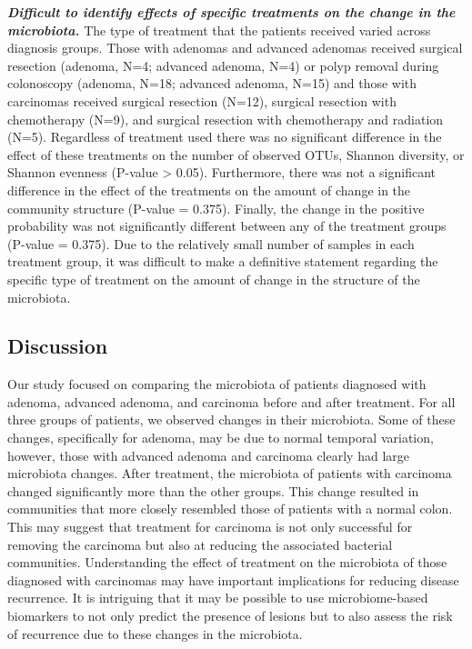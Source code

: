 \documentclass[12pt,]{article}
\begin{document}
\textbf{\emph{Difficult to identify effects of specific treatments on
the change in the microbiota.}} The type of treatment that the patients
received varied across diagnosis groups. Those with adenomas and
advanced adenomas received surgical resection (adenoma, N=4; advanced
adenoma, N=4) or polyp removal during colonoscopy (adenoma, N=18;
advanced adenoma, N=15) and those with carcinomas received surgical
resection (N=12), surgical resection with chemotherapy (N=9), and
surgical resection with chemotherapy and radiation (N=5). Regardless of
treatment used there was no significant difference in the effect of
these treatments on the number of observed OTUs, Shannon diversity, or
Shannon evenness (P-value \textgreater{} 0.05). Furthermore, there was
not a significant difference in the effect of the treatments on the
amount of change in the community structure (P-value = 0.375). Finally,
the change in the positive probability was not significantly different
between any of the treatment groups (P-value = 0.375). Due to the
relatively small number of samples in each treatment group, it was
difficult to make a definitive statement regarding the specific type of
treatment on the amount of change in the structure of the microbiota.

\newpage

\subsection{Discussion}\label{discussion}

Our study focused on comparing the microbiota of patients diagnosed with
adenoma, advanced adenoma, and carcinoma before and after treatment. For
all three groups of patients, we observed changes in their microbiota.
Some of these changes, specifically for adenoma, may be due to normal
temporal variation, however, those with advanced adenoma and carcinoma
clearly had large microbiota changes. After treatment, the microbiota of
patients with carcinoma changed significantly more than the other
groups. This change resulted in communities that more closely resembled
those of patients with a normal colon. This may suggest that treatment
for carcinoma is not only successful for removing the carcinoma but also
at reducing the associated bacterial communities. Understanding the
effect of treatment on the microbiota of those diagnosed with carcinomas
may have important implications for reducing disease recurrence. It is
intriguing that it may be possible to use microbiome-based biomarkers to
not only predict the presence of lesions but to also assess the risk of
recurrence due to these changes in the microbiota.
\end{document}
